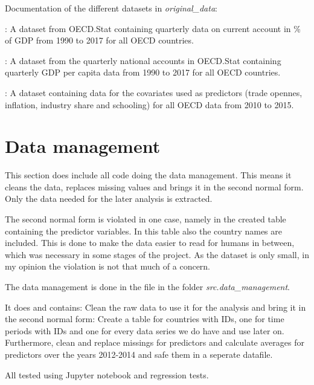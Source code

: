 \documentclass[a4paper,11pt,english]{sphinxmanual}
\begin{document}
Documentation of the different datasets in \emph{original\_data}:

 : A dataset from OECD.Stat containing quarterly data on current account in \% of GDP from 1990 to 2017 for all OECD countries.

 : A dataset from the quarterly national accounts in OECD.Stat containing quarterly GDP per capita data from 1990 to 2017 for all OECD countries.

 : A dataset containing data for the covariates used as predictors (trade opennes, inflation, industry share and schooling) for all OECD data from 2010 to 2015.


\chapter{Data management}
\label{data_management:id1}\label{data_management:data-management}\label{data_management::doc}
This section does include all code doing the data management. This means it cleans the data, replaces missing values and brings it in the second normal form.
Only the data needed for the later analysis is extracted.

The second normal form is violated in one case, namely in the created table containing the predictor variables. In this table also the country names are included.
This is done to make the data easier to read for humans in between, which was necessary in some stages of the project. As the dataset is only small, in my opinion the violation is not that much of a concern.

The data management is done in the file  in the folder \emph{src.data\_management}.

It does and contains:
\label{data_management:module-src.data_management.clean_raw_data}
Clean the raw data to use it for the analysis and bring it in the second normal
form: Create a table for countries with IDs, one for time periods with IDs and
one for every data series we do have and use later on. Furthermore, clean and
replace missings for predictors and calculate averages for predictors over the 
years 2012-2014 and safe them in a seperate datafile.

All tested using Jupyter notebook and regression tests.
\end{document}
